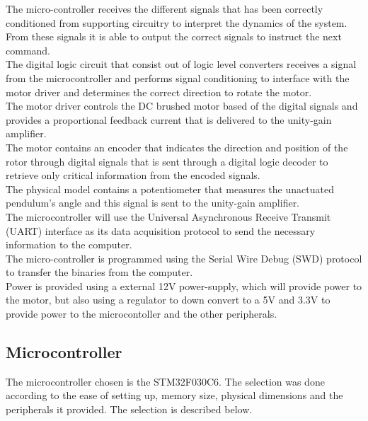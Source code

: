 The micro-controller receives the different signals that has been correctly conditioned from supporting circuitry to interpret the dynamics of the system. From these signals it is able to output the correct signals to instruct the next command.\\

The digital logic circuit that consist out of logic level converters receives a signal from the microcontroller and performs signal conditioning to interface with the motor driver and determines the correct direction to rotate the motor. \\

The motor driver controls the DC brushed motor based of the digital signals and provides a proportional feedback current that is delivered to the unity-gain amplifier.\\

The motor contains an encoder that indicates the direction and position of the rotor through digital signals that is sent through a digital logic decoder to retrieve only critical information from the encoded signals. \\

The physical model contains a potentiometer that measures the unactuated pendulum's angle and this signal is sent to the unity-gain amplifier.\\

The microcontroller will use the Universal Asynchronous Receive Transmit (UART) interface as its data acquisition protocol to send the necessary information to the computer. \\

The micro-controller is programmed using the Serial Wire Debug (SWD) protocol to transfer the binaries from the computer.\\

Power is provided using a external 12V power-supply, which will provide power to the motor, but also using a regulator to down convert to a 5V and 3.3V to provide power to the microcontoller and the other peripherals.


\subsection{Microcontroller}
The microcontroller chosen is the STM32F030C6. The selection was done according to the ease of setting up, memory size, physical dimensions and the peripherals it provided. The selection is described below.\\

